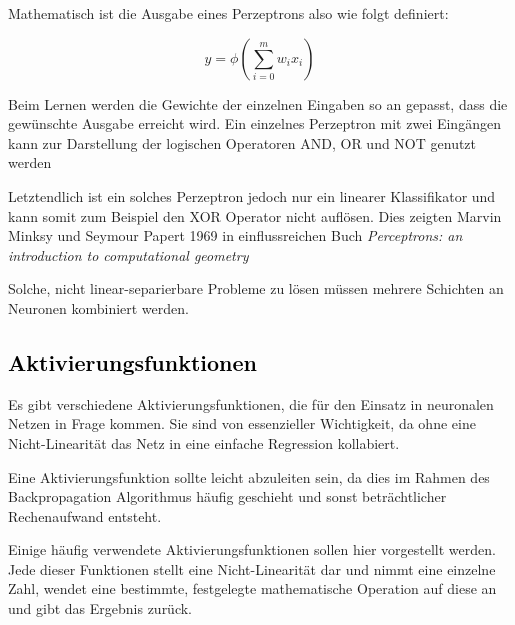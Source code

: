 Mathematisch ist die Ausgabe eines Perzeptrons also wie folgt definiert:

\begin{equation}
	y = \phi ( \sum_{i= 0}^{m} w_i x_i)
\end{equation}

Beim Lernen werden die Gewichte der einzelnen Eingaben so an gepasst, dass die gewünschte Ausgabe erreicht wird.
Ein einzelnes Perzeptron mit zwei Eingängen kann zur Darstellung der logischen Operatoren AND, OR und NOT genutzt werden

Letztendlich ist ein solches Perzeptron jedoch nur ein linearer Klassifikator und kann somit zum Beispiel den XOR Operator nicht auflösen.
Dies zeigten Marvin Minksy und Seymour Papert 1969 in einflussreichen Buch \textit{Perceptrons: an introduction to computational geometry} 

Solche, nicht linear-separierbare Probleme zu lösen müssen mehrere Schichten an Neuronen kombiniert werden.

\subsection{\textcolor{black}{Aktivierungsfunktionen}}
\label{sec:activationfuncs}
Es gibt verschiedene Aktivierungsfunktionen, die für den Einsatz in neuronalen Netzen in Frage kommen.
Sie sind von essenzieller Wichtigkeit, da ohne eine Nicht-Linearität das Netz in eine einfache Regression kollabiert.

Eine Aktivierungsfunktion sollte leicht abzuleiten sein, 
da dies im Rahmen des Backpropagation Algorithmus häufig geschieht und sonst beträchtlicher Rechenaufwand entsteht.

Einige häufig verwendete Aktivierungsfunktionen sollen hier vorgestellt werden.
Jede dieser Funktionen stellt eine Nicht-Linearität dar und nimmt eine einzelne Zahl, wendet eine bestimmte, festgelegte mathematische 
Operation auf diese an und gibt das Ergebnis zurück.


